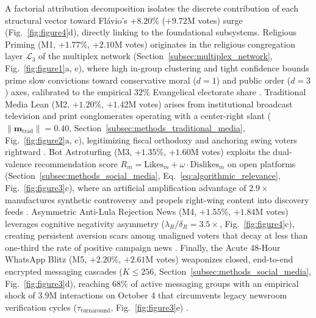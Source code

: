 \documentclass{article}
\begin{document}
A factorial attribution decomposition isolates the discrete contribution of each structural vector toward Fl{\'a}vio's $+8.20\%$ ($+9.72\mathrm{M}$ votes) surge (Fig.~\ref{fig:figure4}d), directly linking to the foundational subsystems. Religious Priming (M1, $+1.77\%$, $+2.10\mathrm{M}$ votes) originates in the religious congregation layer $\mathcal{L}_3$ of the multiplex network (Section~\ref{subsec:multiplex_network}, Fig.~\ref{fig:figure1}a, e), where high in-group clustering and tight confidence bounds prime slow convictions toward conservative moral ($d=1$) and public order ($d=3$) axes, calibrated to the empirical $32\%$ Evangelical electorate share \citep{almeida2019evangelicals}. Traditional Media Lean (M2, $+1.20\%$, $+1.42\mathrm{M}$ votes) arises from institutional broadcast television and print conglomerates operating with a center-right slant ($\|\mathbf{m}_{\mathrm{trad}}\| = 0.40$, Section~\ref{subsec:methods_traditional_media}, Fig.~\ref{fig:figure2}a, c), legitimizing fiscal orthodoxy and anchoring swing voters rightward \citep{mullainathan2005market, gentzkow2006media}. Bot Astroturfing (M3, $+1.35\%$, $+1.60\mathrm{M}$ votes) exploits the dual-valence recommendation score $R_m = \mathrm{Likes}_m + \omega \cdot \mathrm{Dislikes}_m$ on open platforms (Section~\ref{subsec:methods_social_media}, Eq.~\eqref{eq:algorithmic_relevance}, Fig.~\ref{fig:figure3}c), where an artificial amplification advantage of $2.9\times$ manufactures synthetic controversy and propels right-wing content into discovery feeds \citep{keller2020political}. Asymmetric Anti-Lula Rejection News (M4, $+1.55\%$, $+1.84\mathrm{M}$ votes) leverages cognitive negativity asymmetry ($\lambda_R/\delta_R = 3.5\times$, Fig.~\ref{fig:figure4}c), creating persistent aversion scars among unaligned voters that decay at less than one-third the rate of positive campaign news \citep{soroka2014negativity}. Finally, the Acute 48-Hour WhatsApp Blitz (M5, $+2.20\%$, $+2.61\mathrm{M}$ votes) weaponizes closed, end-to-end encrypted messaging cascades ($K \le 256$, Section~\ref{subsec:methods_social_media}, Fig.~\ref{fig:figure3}d), reaching $68\%$ of active messaging groups with an empirical shock of $3.9\mathrm{M}$ interactions on October 4 that circumvents legacy newsroom verification cycles ($\tau_{\mathrm{turnaround}}$, Fig.~\ref{fig:figure3}e) \citep{cesarino2020posverdade}.
\end{document}
